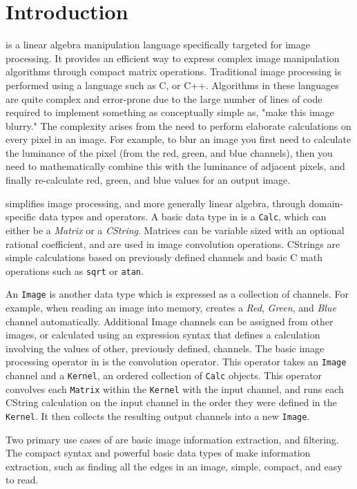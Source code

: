 \chapter{Introduction}
\label{chap:intro}

\sys{} is a linear algebra manipulation language specifically targeted for
image processing. It provides an efficient way to express complex image
manipulation algorithms through compact matrix operations. Traditional image
processing is performed using a language such as C, or C++. Algorithms in these
languages are quite complex and error-prone due to the large number of lines of
code required to implement something as conceptually simple as, "make this image
blurry." The complexity arises from the need to perform elaborate calculations
on every pixel in an image. For example, to blur an image you first need to
calculate the luminance of the pixel (from the red, green, and blue channels),
then you need to mathematically combine this with the luminance of adjacent pixels,
and finally re-calculate red, green, and blue values for an output image.

\sys{} simplifies image processing, and more generally linear algebra, through
domain-specific data types and operators. A basic data type in \sys{} is a
\texttt{Calc}, which can either be a \emph{Matrix} or a \emph{CString}.
Matrices can be variable sized with an optional rational coefficient, and are
used in image convolution operations. CStrings are simple calculations
based on previously defined channels and basic C math operations such as \texttt{sqrt}
or \texttt{atan}.

An \texttt{Image} is another \sys{} data type which is expressed as a collection
of channels. For example, when reading an image into memory, \sys{} creates a
\emph{Red}, \emph{Green}, and \emph{Blue} channel automatically. Additional
Image channels can be assigned from other images, or calculated
using an expression syntax that defines a calculation involving the
values of other, previously defined, channels. The basic image processing operator
in \sys{} is the convolution operator. This operator takes an \texttt{Image} channel and a
\texttt{Kernel}, an ordered collection of \texttt{Calc} objects. This
operator convolves each \texttt{Matrix} within the \texttt{Kernel} with the input channel,
and runs each CString calculation on the input channel in the order they were defined in
the \texttt{Kernel}. It then collects the resulting output channels into a new \texttt{Image}.

Two primary use cases of \sys{} are basic image information extraction, and
filtering. The compact syntax and powerful basic data types of \sys{} make
information extraction, such as finding all the edges in an image, simple, compact,
and easy to read.

